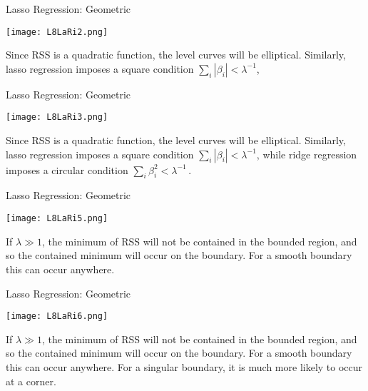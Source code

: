 \documentclass[10pt, table, dvipsnames,xcdraw,handout]{beamer}
\begin{document}
\begin{frame}[fragile]{Lasso Regression: Geometric} 
  \begin{minipage}[t][0.5\textheight][t]{\textwidth}
	\centering \texttt{[image: L8LaRi2.png]} 
  \end{minipage}
  \vfill
\begin{minipage}[t][0.5\textheight][t]{\textwidth}
Since RSS is a quadratic function, the {\color{red}level curves} will be elliptical. Similarly, {\color{ForestGreen} lasso regression} imposes a square condition $\sum_i|\beta_i|<\lambda^{-1}$,
\end{minipage}
\end{frame}



\begin{frame}[fragile]{Lasso Regression: Geometric} 
  \begin{minipage}[t][0.5\textheight][t]{\textwidth}
	\centering \texttt{[image: L8LaRi3.png]} 
  \end{minipage}
  \vfill
\begin{minipage}[t][0.5\textheight][t]{\textwidth}
Since RSS is a quadratic function, the {\color{red}level curves} will be elliptical. Similarly, {\color{ForestGreen} lasso regression} imposes a square condition $\sum_i|\beta_i|<\lambda^{-1}$,
while {\color{blue} ridge regression} imposes a circular condition $\sum_i\beta_i^2<\lambda^{-1}\,.$
\end{minipage}
\end{frame}





\begin{frame}[fragile]{Lasso Regression: Geometric} 
  \begin{minipage}[t][0.5\textheight][t]{\textwidth}
	\centering \texttt{[image: L8LaRi5.png]} 
  \end{minipage}
  \vfill
\begin{minipage}[t][0.5\textheight][t]{\textwidth}
If $\lambda\gg 1$, the minimum of RSS will not be contained in the bounded region, and so the contained minimum will occur on the boundary. For a smooth boundary this can occur anywhere.
\end{minipage}
\end{frame}




\begin{frame}[fragile]{Lasso Regression: Geometric} 
  \begin{minipage}[t][0.5\textheight][t]{\textwidth}
	\centering \texttt{[image: L8LaRi6.png]} 
  \end{minipage}
  \vfill
\begin{minipage}[t][0.5\textheight][t]{\textwidth}
If $\lambda\gg 1$, the minimum of RSS will not be contained in the bounded region, and so the contained minimum will occur on the boundary. For a smooth boundary this can occur anywhere. For a singular boundary, it is much more likely to occur at a corner.
\end{minipage}
\end{frame}
\end{document}
